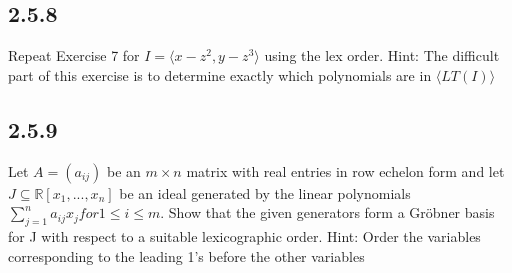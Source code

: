 \documentclass[]{article}
\newcommand\<{\langle}
\renewcommand\>{\rangle}
\newcommand{\RR}{\ensuremath{\mathbb{R}}}
\begin{document}
\subsection*{2.5.8} Repeat Exercise 7 for $I = \<x - z^2, y - z^3\>$ using the lex order. Hint: The difficult part of this exercise is to determine exactly which polynomials are in $\<LT(I)\>$

\subsection*{2.5.9} Let $A = (a_{ij})$ be an $m \times n$ matrix with real entries in row echelon form and let $J \subseteq \RR[x_1 , . . . , x_n ]$ be an ideal generated by the linear polynomials $\sum_{j=1}^{n}  a_{ij} x_j for 1 \leq i \leq m$.
Show that the given generators form a Gröbner basis for J with respect to a suitable
lexicographic order. Hint: Order the variables corresponding to the leading 1’s before
the other variables
\end{document}
